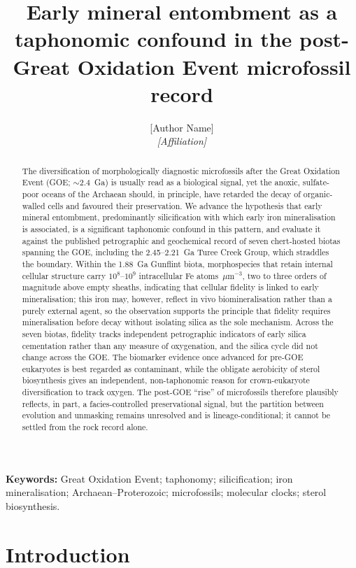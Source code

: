 \documentclass[11pt]{article}
\title{\vspace{-1.0cm}\textbf{Early mineral entombment as a taphonomic confound in the
post-Great Oxidation Event microfossil record}}
\author{[Author Name]\\
\small\textit{[Affiliation]}}
\date{}
\begin{document}
\maketitle

\begin{abstract}
\noindent The diversification of morphologically diagnostic microfossils after the Great Oxidation
Event (GOE; $\sim$2.4~Ga) is usually read as a biological signal, yet the anoxic, sulfate-poor
oceans of the Archaean should, in principle, have retarded the decay of organic-walled cells and
favoured their preservation. We advance the hypothesis that early mineral entombment, predominantly
silicification with which early iron mineralisation is associated, is a significant taphonomic
confound in this pattern, and evaluate it against the published petrographic and geochemical record
of seven chert-hosted biotas spanning the GOE, including the 2.45--2.21~Ga Turee Creek Group, which
straddles the boundary. Within the 1.88~Ga Gunflint biota, morphospecies that retain internal
cellular structure carry $10^{8}$--$10^{9}$ intracellular Fe atoms~$\mu$m$^{-3}$, two to three
orders of magnitude above empty sheaths, indicating that cellular fidelity is linked to early
mineralisation; this iron may, however, reflect in vivo biomineralisation rather than a purely
external agent, so the observation supports the principle that fidelity requires mineralisation before
decay without isolating silica as the sole mechanism. Across the seven biotas, fidelity tracks
independent petrographic indicators of early silica cementation rather than any measure of
oxygenation, and the silica cycle did not change across the GOE. The biomarker evidence once advanced
for pre-GOE eukaryotes is best regarded as contaminant, while the obligate aerobicity of sterol
biosynthesis gives an independent, non-taphonomic reason for crown-eukaryote diversification to
track oxygen. The post-GOE ``rise'' of microfossils therefore plausibly reflects, in part, a
facies-controlled preservational signal, but the partition between evolution and unmasking remains
unresolved and is lineage-conditional; it cannot be settled from the rock record alone.
\end{abstract}

\noindent\textbf{Keywords:} Great Oxidation Event; taphonomy; silicification; iron mineralisation;
Archaean--Proterozoic; microfossils; molecular clocks; sterol biosynthesis.

\section{Introduction}
\end{document}
